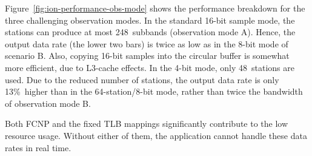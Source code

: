 \documentclass{sig-alternate}
\begin{document}
Figure~\ref{fig:ion-performance-obs-mode} shows the performance breakdown
for the three challenging observation modes.
In the standard 16-bit sample mode, the stations can produce at most
248~subbands (observation mode \textsf{A}).
Hence, the output data rate (the lower two bars) is twice as low as in the
8-bit mode of scenario \textsf{B}.
Also, copying 16-bit samples into the circular buffer is somewhat more
efficient, due to L3-cache effects.
In the 4-bit mode, only 48~stations are used.
Due to the reduced number of stations, the output data rate is only 13\%~higher
than in the 64-station/8-bit mode, rather than twice the bandwidth of
observation mode \textsf{B}.



Both FCNP and the fixed TLB mappings significantly contribute to the low
resource usage.
Without either of them, the application cannot handle these data rates in
real time.
\end{document}
